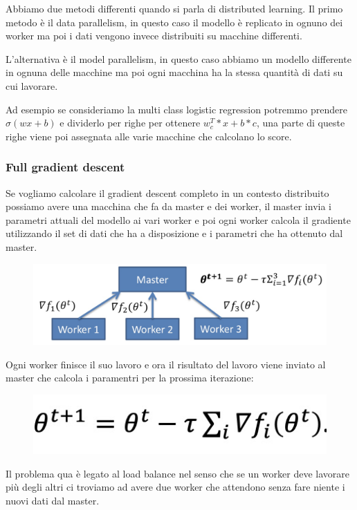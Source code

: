 \documentclass[14pt]{extreport}
\begin{document}
Abbiamo due metodi differenti quando si parla di distributed learning. Il primo metodo è il data parallelism, in questo caso il modello è replicato in
ognuno dei worker ma poi i dati vengono invece distribuiti su macchine differenti.


L'alternativa è il model parallelism, in questo caso abbiamo un modello differente in ognuna delle macchine ma poi ogni macchina ha la stessa quantità
di dati su cui lavorare.

 Ad esempio se consideriamo la multi class logistic regression potremmo prendere $\sigma(wx+b)$ e dividerlo per righe per ottenere $w_c^T*x+b*c$, una
 parte di queste righe viene poi assegnata alle varie macchine che calcolano lo score.
 
 \subsubsection{Full gradient descent}
 
 Se vogliamo calcolare il gradient descent completo in un contesto distribuito possiamo avere una macchina che fa da master e dei worker, il master
invia i parametri attuali del modello ai vari worker e poi ogni worker calcola il gradiente utilizzando il set di dati che ha a disposizione e i
parametri che ha ottenuto dal master.

\begin{figure}[H]
\centering
\includegraphics[width=0.7\linewidth]{273.jpeg}
\end{figure}

Ogni worker finisce il suo lavoro e ora il risultato del lavoro viene inviato al master che calcola i paramentri per la prossima iterazione:

\begin{figure}[H]
\centering
\includegraphics[width=0.5\linewidth]{272.jpeg}
\end{figure}

Il problema qua è legato al load balance nel senso che se un worker deve lavorare più degli altri ci troviamo ad avere due worker che attendono senza
fare niente i nuovi dati dal master.
\end{document}
